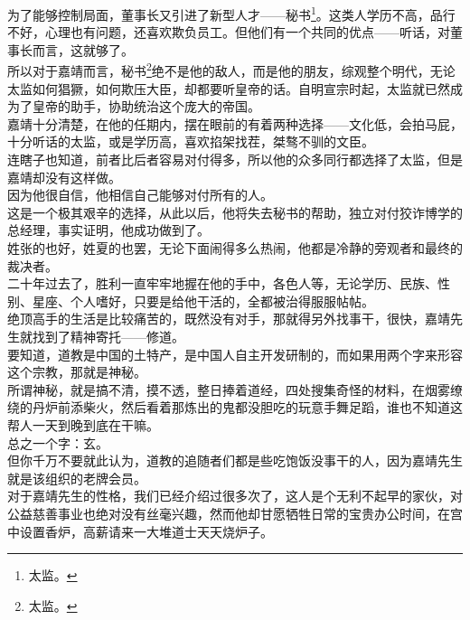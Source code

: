 \begin{multicols}{\theparacolNo}
为了能够控制局面，董事长又引进了新型人才——秘书\footnote{太监。}。这类人学历不高，品行不好，心理也有问题，还喜欢欺负员工。但他们有一个共同的优点——听话，对董事长而言，这就够了。\\

所以对于嘉靖而言，秘书\footnote{太监。}绝不是他的敌人，而是他的朋友，综观整个明代，无论太监如何猖獗，如何欺压大臣，却都要听皇帝的话。自明宣宗时起，太监就已然成为了皇帝的助手，协助统治这个庞大的帝国。\\

嘉靖十分清楚，在他的任期内，摆在眼前的有着两种选择——文化低，会拍马屁，十分听话的太监，或是学历高，喜欢掐架找茬，桀骜不驯的文臣。\\

连瞎子也知道，前者比后者容易对付得多，所以他的众多同行都选择了太监，但是嘉靖却没有这样做。\\

因为他很自信，他相信自己能够对付所有的人。\\

这是一个极其艰辛的选择，从此以后，他将失去秘书的帮助，独立对付狡诈博学的总经理，事实证明，他成功做到了。\\

姓张的也好，姓夏的也罢，无论下面闹得多么热闹，他都是冷静的旁观者和最终的裁决者。\\

二十年过去了，胜利一直牢牢地握在他的手中，各色人等，无论学历、民族、性别、星座、个人嗜好，只要是给他干活的，全都被治得服服帖帖。\\

绝顶高手的生活是比较痛苦的，既然没有对手，那就得另外找事干，很快，嘉靖先生就找到了精神寄托——修道。\\

要知道，道教是中国的土特产，是中国人自主开发研制的，而如果用两个字来形容这个宗教，那就是神秘。\\

所谓神秘，就是搞不清，摸不透，整日捧着道经，四处搜集奇怪的材料，在烟雾缭绕的丹炉前添柴火，然后看着那炼出的鬼都没胆吃的玩意手舞足蹈，谁也不知道这帮人一天到晚到底在干嘛。\\

总之一个字：玄。\\

但你千万不要就此认为，道教的追随者们都是些吃饱饭没事干的人，因为嘉靖先生就是该组织的老牌会员。\\

对于嘉靖先生的性格，我们已经介绍过很多次了，这人是个无利不起早的家伙，对公益慈善事业也绝对没有丝毫兴趣，然而他却甘愿牺牲日常的宝贵办公时间，在宫中设置香炉，高薪请来一大堆道士天天烧炉子。\\


\end{multicols}
